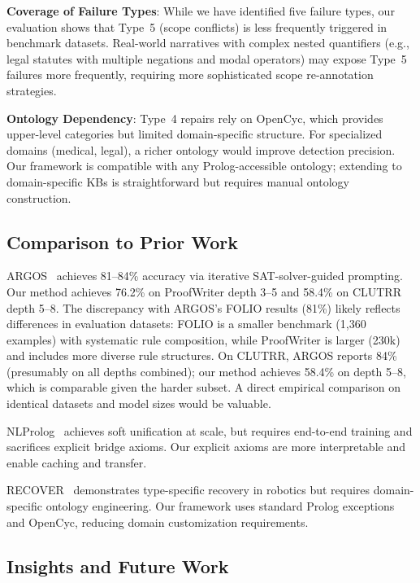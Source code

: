 \documentclass[11pt,letterpaper]{article}
\begin{document}
\textbf{Coverage of Failure Types}: While we have identified five failure types, our evaluation shows that Type~5 (scope conflicts) is less frequently triggered in benchmark datasets. Real-world narratives with complex nested quantifiers (e.g., legal statutes with multiple negations and modal operators) may expose Type~5 failures more frequently, requiring more sophisticated scope re-annotation strategies.

\textbf{Ontology Dependency}: Type~4 repairs rely on OpenCyc, which provides upper-level categories but limited domain-specific structure. For specialized domains (medical, legal), a richer ontology would improve detection precision. Our framework is compatible with any Prolog-accessible ontology; extending to domain-specific KBs is straightforward but requires manual ontology construction.

\subsection{Comparison to Prior Work}

ARGOS~\citep{Cotnareanu2026} achieves 81--84\% accuracy via iterative SAT-solver-guided prompting. Our method achieves 76.2\% on ProofWriter depth 3--5 and 58.4\% on CLUTRR depth 5--8. The discrepancy with ARGOS's FOLIO results (81\%) likely reflects differences in evaluation datasets: FOLIO is a smaller benchmark (1,360 examples) with systematic rule composition, while ProofWriter is larger (230k) and includes more diverse rule structures. On CLUTRR, ARGOS reports 84\% (presumably on all depths combined); our method achieves 58.4\% on depth 5--8, which is comparable given the harder subset. A direct empirical comparison on identical datasets and model sizes would be valuable.

NLProlog~\citep{Weber2019} achieves soft unification at scale, but requires end-to-end training and sacrifices explicit bridge axioms. Our explicit axioms are more interpretable and enable caching and transfer.

RECOVER~\citep{Cornelio2024} demonstrates type-specific recovery in robotics but requires domain-specific ontology engineering. Our framework uses standard Prolog exceptions and OpenCyc, reducing domain customization requirements.

\subsection{Insights and Future Work}
\end{document}
